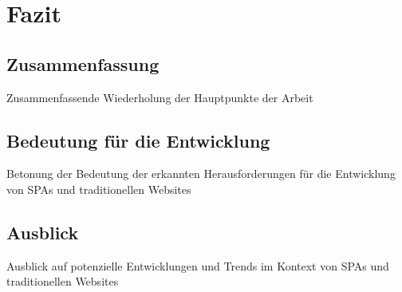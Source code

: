 \section{Fazit}
\subsection{Zusammenfassung}
Zusammenfassende Wiederholung der Hauptpunkte der Arbeit
\subsection{Bedeutung für die Entwicklung}
Betonung der Bedeutung der erkannten Herausforderungen für die Entwicklung von SPAs und traditionellen Websites
\subsection{Ausblick}
Ausblick auf potenzielle Entwicklungen und Trends im Kontext von SPAs und traditionellen Websites